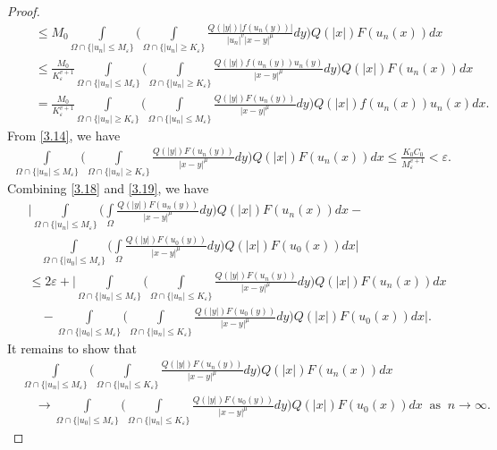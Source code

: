 \documentclass[11pt]{amsart}
\numberwithin{equation}{section}
\newcommand{\1}{\frac{1}{2}}
\begin{document}
\begin{proof}
\begin{align}
			&\quad\leq M_0 \int\limits_{\Omega \cap \{ |u_n|\leq M_\varepsilon\}} \Bigg( \int\limits_{\Omega \cap \{ |u_n|\geq K_\varepsilon\}} \frac{Q(|y|)|f(u_n(y))|}{|u_n|^v|x-y|^\mu}dy \Bigg)  Q(|x|)F(u_n(x))dx\nonumber\\
			&\quad \leq \frac{M_0}{K_\varepsilon^{v+1}} \int\limits_{\Omega \cap \{ |u_n|\leq M_\varepsilon\}} \Bigg( \int\limits_{\Omega \cap \{|u_n|\geq K_\varepsilon\}} \frac{Q(|y|)f(u_n(y))u_n(y)}{|x-y|^\mu}dy \Bigg) Q(|x|)F(u_n(x))dx\nonumber\\
			&\quad = \frac{M_0}{K_\varepsilon^{v+1}} \int\limits_{\Omega \cap \{ |u_n|\geq K_\varepsilon\}} \Bigg( \int\limits_{\Omega \cap \{|u_n|\leq M_\varepsilon\}} \frac{Q(|y|)F(u_n(y))}{|x-y|^\mu}dy \Bigg) Q(|x|)f(u_n(x)) u_n(x)dx.\nonumber
		\end{align}
		From \eqref{3.14}, we have
		\begin{align}
			\label{3.19}
			\int\limits_{\Omega \cap \{|u_n| \leq M_\varepsilon\}} \Bigg( \int\limits_{\Omega \cap \{|u_n|\geq K_\varepsilon\}} \frac{Q(|y|)F(u_n(y))}{|x-y|^\mu}dy \Bigg) Q(|x|)F(u_n(x))dx
			\leq \frac{K_0 C_0}{M_\varepsilon^{v+1}} <\varepsilon.
		\end{align}
		Combining \eqref{3.18} and \eqref{3.19}, we have
		\begin{align*}
			&\Bigg|\int\limits_{\Omega \cap \{ |u_n| \leq M_\varepsilon\}} \Bigg( \int\limits_{\Omega} \frac{Q(|y|)F(u_n(y))}{|x-y|^\mu}dy \Bigg) Q(|x|)F(u_n(x))dx  - \\
			& \quad \int\limits_{\Omega \cap \{|u_0| \leq M_\varepsilon\}} \Bigg( \int\limits_{\Omega} \frac{Q(|y|)F(u_0(y))}{|x-y|^\mu}dy \Bigg) Q(|x|)F(u_0(x))dx\Bigg|\\
			&\leq 2\varepsilon + \Bigg|\int\limits_{\Omega \cap \{ |u_n| \leq M_\varepsilon\}} \Bigg( \int\limits_{\Omega \cap \{ |u_n| \leq K_\varepsilon\}} \frac{Q(|y|)F(u_n(y))}{|x-y|^\mu}dy \Bigg) Q(|x|)F(u_n(x))dx\\
			& \quad  - \int\limits_{\Omega \cap \{|u_0| \leq M_\varepsilon\}} \Bigg( \int\limits_{\Omega \cap \{|u_n| \leq K_\varepsilon\}} \frac{Q(|y|)F(u_0(y))}{|x-y|^\mu}dy \Bigg) Q(|x|)F(u_0(x))dx\Bigg|.
		\end{align*}
		It remains to show that 
		\begin{align*}
			&\int\limits_{\Omega \cap \{ |u_n| \leq M_\varepsilon\}} \Bigg( \int\limits_{\Omega \cap \{ |u_n| \leq K_\varepsilon\}} \frac{Q(|y|)F(u_n(y))}{|x-y|^\mu}dy \Bigg) Q(|x|)F(u_n(x))dx \\ &\quad \to \int\limits_{\Omega \cap \{|u_0| \leq M_\varepsilon\}} \Bigg( \int\limits_{\Omega \cap \{|u_n| \leq K_\varepsilon\}} \frac{Q(|y|)F(u_0(y))}{|x-y|^\mu}dy \Bigg) Q(|x|)F(u_0(x))dx \ \text{ as } \ n \to \infty.
		\end{align*}
		

\end{proof}
\end{document}
